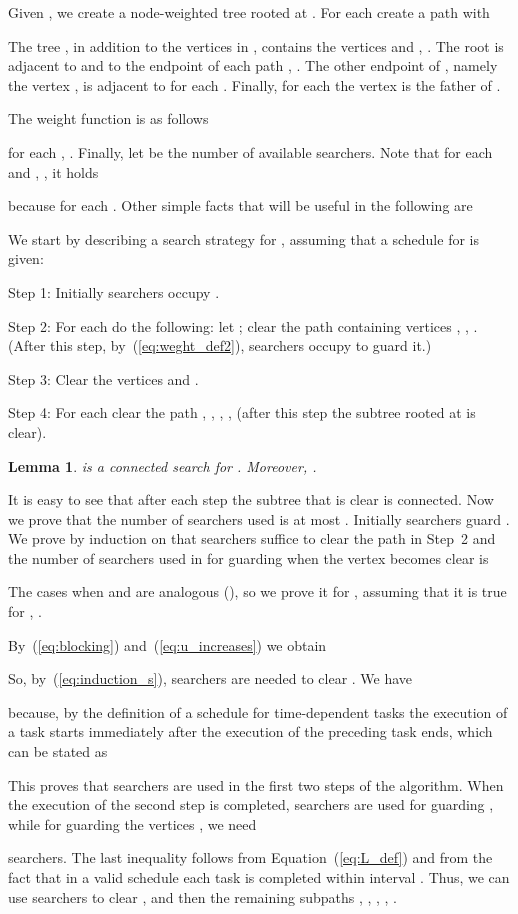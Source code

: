 \documentclass[10pt]{article}
\newenvironment{proof}[1][Proof]
{\par\noindent{\bf #1:} }{\hspace*{\fill}\nolinebreak{}\bigskip\par}
\newtheorem{lemma}{Lemma}
\begin{document}
Given , we create a node-weighted tree  rooted at .
For each  create a path  with



The tree , in addition to the vertices in , contains the vertices  and , .
The root  is adjacent to  and to the endpoint  of each path , . The other endpoint of , namely the vertex , is adjacent to  for each . Finally, for each  the vertex  is the father of .

The weight function  is as follows



for each , . Finally, let  be the number of available searchers.
Note that for each  and , , it holds

because  for each . Other simple facts that will be useful in the following are



We start by describing a search strategy  for , assuming that a schedule  for  is given:
\begin{list}{}{}
\item[Step 1:] Initially  searchers occupy .
\item[Step 2:] For each  do the following: let ; clear the path  containing vertices , , . (After this step, by~(\ref{eq:weght_def2}),  searchers occupy  to guard it.)
\item[Step 3:] Clear the vertices  and .
\item[Step 4:] For each  clear the path , , , ,  (after this step the subtree rooted at  is clear).
\end{list}

\begin{lemma} \label{lem:C_is_a_search}
 is a connected search for . Moreover, .
\end{lemma}
\begin{proof}
It is easy to see that after each step the subtree that is clear is connected. Now we prove that the number of searchers used is at most . Initially  searchers guard . We prove by induction on  that  searchers suffice to clear the path  in Step~2 and the number of searchers used in  for guarding when the vertex  becomes clear is


The cases when  and  are analogous (), so we prove it for , assuming that it is true for , .

By~(\ref{eq:blocking}) and~(\ref{eq:u_increases}) we obtain

So, by~(\ref{eq:induction_s}),  searchers are needed to clear . We have

because, by the definition of a schedule for time-dependent tasks the execution of a task  starts immediately after the execution of the preceding task ends, which can be stated as

This proves that  searchers are used in the first two steps of the algorithm. When the execution of the second step is completed,  searchers are used for guarding , while for guarding the vertices ,  we need

searchers. The last inequality follows from Equation~(\ref{eq:L_def}) and from the fact that in a valid schedule  each task is completed within interval . Thus, we can use  searchers to clear ,  and then the remaining subpaths , , , , .
\end{proof}
\end{document}
